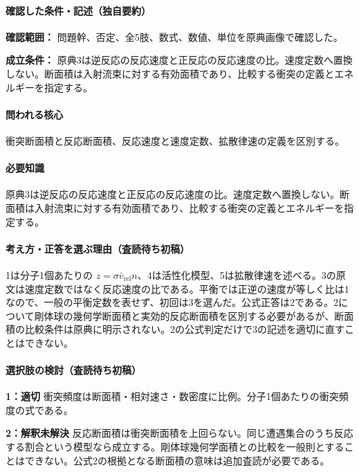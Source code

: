 \paragraph{確認した条件・記述（独自要約）}\mbox{}\par

\noindent\textbf{確認範囲：} 問題幹、否定、全5肢、数式、数値、単位を原典画像で確認した。\par

\noindent\textbf{成立条件：} 原典3は逆反応の反応速度と正反応の反応速度の比。速度定数へ置換しない。断面積は入射流束に対する有効面積であり、比較する衝突の定義とエネルギーを指定する。\par

\paragraph{問われる核心} 衝突断面積と反応断面積、反応速度と速度定数、拡散律速の定義を区別する。

\paragraph{必要知識} 原典3は逆反応の反応速度と正反応の反応速度の比。速度定数へ置換しない。断面積は入射流束に対する有効面積であり、比較する衝突の定義とエネルギーを指定する。

\paragraph{考え方・正答を選ぶ理由（査読待ち初稿）} 1は分子1個あたりの \(z=\sigma\bar v_{\mathrm{rel}}n\)、4は活性化模型、5は拡散律速を述べる。3の原文は速度定数ではなく反応速度の比である。平衡では正逆の速度が等しく比は1なので、一般の平衡定数を表せず、初回は3を選んだ。公式正答は2である。2について剛体球の幾何学断面積と実効的反応断面積を区別する必要があるが、断面積の比較条件は原典に明示されない。2の公式判定だけで3の記述を適切に直すことはできない。

\paragraph{選択肢の検討（査読待ち初稿）}\mbox{}\par

\noindent\textbf{1：適切} 衝突頻度は断面積・相対速さ・数密度に比例。分子1個あたりの衝突頻度の式である。\par

\noindent\textbf{2：解釈未解決} 反応断面積は衝突断面積を上回らない。同じ遭遇集合のうち反応する割合という模型なら成立する。剛体球幾何学面積との比較を一般則とすることはできない。公式2の根拠となる断面積の意味は追加査読が必要である。\par

